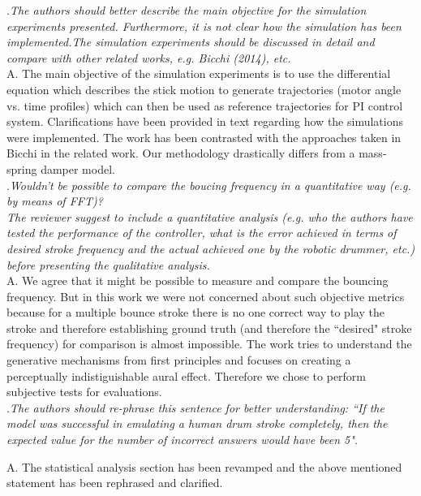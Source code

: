 \documentclass[]{article}
\begin{document}
.\textit{The authors should better describe the main objective for the simulation experiments presented. Furthermore, it is not clear how the simulation has been
	implemented.The simulation experiments should be discussed in detail and compare with other related works, e.g. Bicchi (2014), etc.}\\
\noindent A. The main objective of the simulation experiments is to use the differential equation which describes the stick motion to generate trajectories (motor angle vs. time profiles) which can then be used as reference trajectories for PI control system. Clarifications have been provided in text regarding how the simulations were implemented. The work has been contrasted with the approaches taken in Bicchi in the related work. Our methodology drastically differs from a mass-spring damper model. \\

.\textit{Wouldn't be possible to compare the boucing frequency in a quantitative way (e.g. by means of FFT)? \\
	The reviewer suggest to include a quantitative analysis (e.g. who the authors have tested the performance of the controller, what is the error achieved
	in terms of desired stroke frequency and the actual achieved one by the robotic drummer, etc.) before presenting the qualitative analysis. }\\

\noindent A. We agree that it might be possible to measure and compare the bouncing frequency. But in this work we were not concerned about such objective metrics because for a multiple bounce stroke there is no one correct way to play the stroke and therefore establishing ground truth (and therefore the ``desired" stroke frequency) for comparison is almost impossible. The work tries to understand the generative mechanisms from first principles and focuses on creating a perceptually indistiguishable aural effect. Therefore we chose to perform subjective tests for evaluations.\\

.\textit{The authors should re-phrase this sentence for better understanding: ``If the model was successful in emulating a human drum stroke completely,
	then the expected value for the number of incorrect answers would have been 5".}

\noindent A. The statistical analysis section has been revamped and the above mentioned statement has been rephrased and clarified. \\
\end{document}

